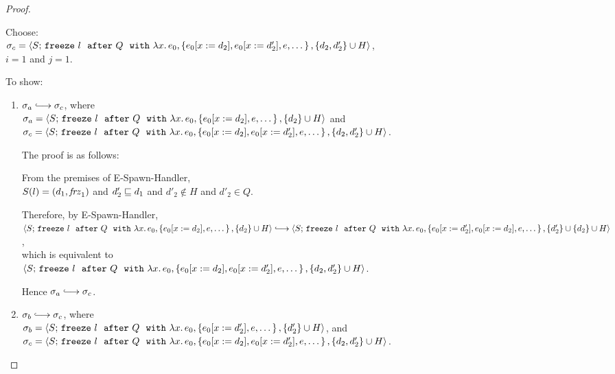 \begin{proof}
\begin{itemize}
\begin{itemize}
\begin{itemize}
          Choose: \\ 

          $\sigma_c = \langle S;\, \mbox{\texttt{freeze}}~l~~{\mbox{\texttt{after}}}~Q~~{\mbox{\texttt{with}}}~\lambda x.\,e_0, \left\{e_0[x := d_2],
                e_0[x := d'_2], e, \dots\right\}, \{d_2, d'_2\}\cup H \rangle$, \\
          $i = 1$ and $j = 1$.

          To show:
          \begin{enumerate}
          \item $\conf_a \parstepsto \conf_c$, where \\
            $\sigma_a = \langle S;\, \mbox{\texttt{freeze}}~l~~{\mbox{\texttt{after}}}~Q~~{\mbox{\texttt{with}}}~\lambda x.\,e_0, \left\{e_0[x := d_2],
                e, \dots\right\}, \{d_2\}\cup H \rangle$ and \\
            $\sigma_c = \langle S;\, \mbox{\texttt{freeze}}~l~~{\mbox{\texttt{after}}}~Q~~{\mbox{\texttt{with}}}~\lambda x.\,e_0, \left\{e_0[x := d_2],
                  e_0[x := d'_2], e, \dots\right\}, \{d_2, d'_2\}\cup H \rangle$.

            The proof is as follows:

            From the premises of {\sc E-Spawn-Handler}, \\
            $S(l) = (d_1, \mathit{frz}_1)$ and
            $d'_2 \sqsubseteq d_1$ and 
            $d'_2 \notin H$ and
            $d'_2 \in Q$.

            Therefore, by {\sc E-Spawn-Handler}, \\
            $\config{S}{\freezeafterfull{l}{Q}{\lam{x}{e_0}}{\setof{\subst{e_0}{x}{d_2},
                e, \dots}} {\{d_2\}\cup H}} \parstepsto \\
            \config{S}{\freezeafterfull{l}{Q}{\lam{x}{e_0}}{\setof{\subst{e_0}{x}{d'_2}, \subst{e_0}{x}{d_2},
                  e, \dots}} \setof{d'_2} \cup {\{d_2\}\cup H}}$, \\
            which is equivalent to \\

            $\langle S;\, \mbox{\texttt{freeze}}~l~~{\mbox{\texttt{after}}}~Q~~{\mbox{\texttt{with}}}~\lambda x.\,e_0, \left\{e_0[x := d_2],
                  e_0[x := d'_2], e, \dots\right\}, \{d_2, d'_2\}\cup
                H \rangle$.

            Hence $\conf_a \parstepsto \conf_c$.

          \item $\conf_b \parstepsto \conf_c$, where \\
            $\sigma_b = \langle S;\, \mbox{\texttt{freeze}}~l~~{\mbox{\texttt{after}}}~Q~~{\mbox{\texttt{with}}}~\lambda x.\,e_0, \left\{e_0[x := d'_2],
                e, \dots\right\}, \{d'_2\}\cup H \rangle$, and \\
            $\sigma_c = \langle S;\, \mbox{\texttt{freeze}}~l~~{\mbox{\texttt{after}}}~Q~~{\mbox{\texttt{with}}}~\lambda x.\,e_0, \left\{e_0[x := d_2],
                  e_0[x := d'_2], e, \dots\right\}, \{d_2, d'_2\}\cup H \rangle$.


\end{enumerate}
\end{itemize}
\end{itemize}
\end{itemize}
\end{proof}
